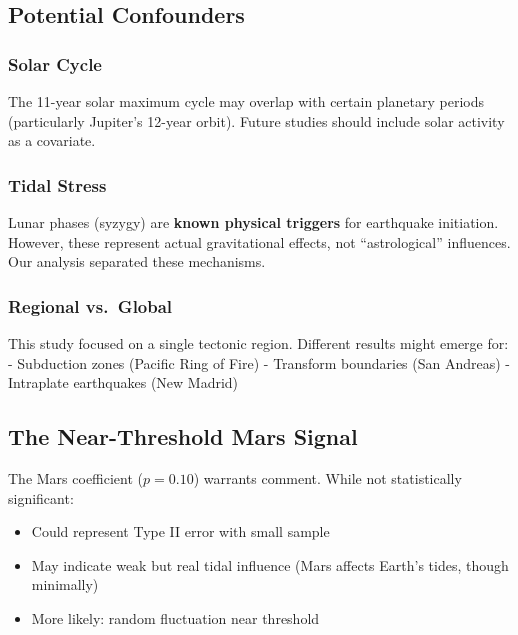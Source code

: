 \documentclass[
  11pt,
  a4paper,
  oneside,
  openany]{article}
\providecommand{\tightlist}{%
  \setlength{\itemsep}{0pt}\setlength{\parskip}{0pt}}\usepackage{longtable,booktabs,array}
\begin{document}
\subsection{Potential Confounders}\label{potential-confounders}

\subsubsection{Solar Cycle}\label{solar-cycle}

The 11-year solar maximum cycle may overlap with certain planetary
periods (particularly Jupiter's 12-year orbit). Future studies should
include solar activity as a covariate.

\subsubsection{Tidal Stress}\label{tidal-stress}

Lunar phases (syzygy) are \textbf{known physical triggers} for
earthquake initiation. However, these represent actual gravitational
effects, not ``astrological'' influences. Our analysis separated these
mechanisms.

\subsubsection{Regional vs.~Global}\label{regional-vs.-global}

This study focused on a single tectonic region. Different results might
emerge for: - Subduction zones (Pacific Ring of Fire) - Transform
boundaries (San Andreas) - Intraplate earthquakes (New Madrid)

\subsection{The Near-Threshold Mars
Signal}\label{the-near-threshold-mars-signal}

The Mars coefficient (\(p = 0.10\)) warrants comment. While not
statistically significant:

\begin{itemize}
\tightlist
\item
  Could represent Type II error with small sample
\item
  May indicate weak but real tidal influence (Mars affects Earth's
  tides, though minimally)
\item
  More likely: random fluctuation near threshold
\end{itemize}
\end{document}

